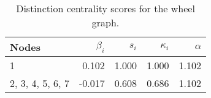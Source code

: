 \begin{table}
\centering
\caption{\label{tab:wheel}Distinction centrality scores for the wheel graph.}
\centering
\begin{tabular}[t]{lrrrr}
\toprule
Nodes & $\beta_i$ & $s_i$ & $\kappa_i$ & $\alpha$\\
\midrule
1 & 0.102 & 1.000 & 1.000 & 1.102\\
2, 3, 4, 5, 6, 7 & -0.017 & 0.608 & 0.686 & 1.102\\
\bottomrule
\end{tabular}
\end{table}
